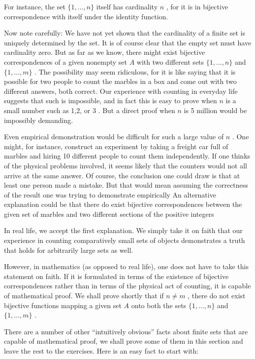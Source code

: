 For instance, the set \(\{ 1,\ldots ,n\}\) itself has cardinality \(n\) , for it is in bijective correspondence with itself under the identity function.

Now note carefully: We have not yet shown that the cardinality of a finite set is uniquely determined by the set. It is of course clear that the empty set must have cardinality zero. But as far as we know, there might exist bijective correspondences of a given nonempty set \(A\) with two different sets \(\{ 1,\ldots ,n\}\) and \(\{ 1,\ldots ,m\}\) . The possibility may seem ridiculous, for it is like saying that it is possible for two people to count the marbles in a box and come out with two different answers, both correct. Our experience with counting in everyday life suggests that such is impossible, and in fact this is easy to prove when \(n\) is a small number such as 1,2, or 3 . But a direct proof when \(n\) is 5 million would be impossibly demanding.

Even empirical demonstration would be difficult for such a large value of \(n\) . One might, for instance, construct an experiment by taking a freight car full of marbles and hiring 10 different people to count them independently. If one thinks of the physical problems involved, it seems likely that the counters would not all arrive at the same answer. Of course, the conclusion one could draw is that at least one person made a mistake. But that would mean assuming the correctness of the result one was trying to demonstrate empirically An alternative explanation could be that there do exist bijective correspondences between the given set of marbles and two different sections of the positive integers

In real life, we accept the first explanation. We simply take it on faith that our experience in counting comparatively small sets of objects demonstrates a truth that holds for arbitrarily large sets as well.

However, in mathematics (as opposed to real life), one does not have to take this statement on faith. If it is formulated in terms of the existence of bijective correspondences rather than in terms of the physical act of counting, it is capable of mathematical proof. We shall prove shortly that if \(n \neq  m\) , there do not exist bijective functions mapping a given set \(A\) onto both the sets \(\{ 1,\ldots ,n\}\) and \(\{ 1,\ldots ,m\}\) .

There are a number of other ``intuitively obvious'' facts about finite sets that are capable of mathematical proof, we shall prove some of them in this section and leave the rest to the exercises. Here is an easy fact to start with:

